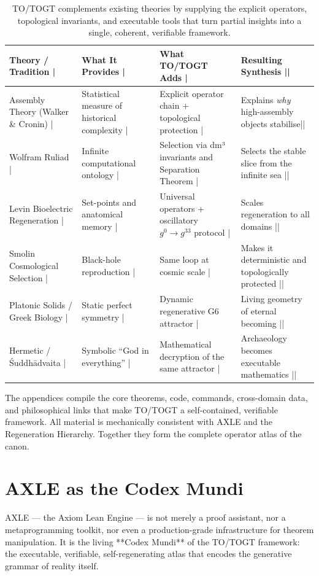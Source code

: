 \documentclass[19pt]{book}
\theoremstyle{plain}
\theoremstyle{definition}
\theoremstyle{remark}
\begin{document}
\begin{enumerate}
\begin{itemize}
\begin{table}[htbp]
\centering
\small
\begin{tabularx}{\textwidth}{}
\toprule
\textbf{Theory / Tradition |} & 
\textbf{What It Provides |} & 
\textbf{What TO/TOGT Adds |} & 
\textbf{Resulting Synthesis ||} \\
\midrule
Assembly Theory (Walker \& Cronin) | & 
Statistical measure of historical complexity | & 
Explicit operator chain + topological protection | & 
Explains \emph{why} high-assembly objects stabilise|| \\
Wolfram Ruliad | & 
Infinite computational ontology | & 
Selection via dm³ invariants and Separation Theorem | & 
Selects the stable slice from the infinite sea || \\
Levin Bioelectric Regeneration | & 
Set-points and anatomical memory | & 
Universal operators + oscillatory \(g^0 \to g^{33}\) protocol | & 
Scales regeneration to all domains || \\
Smolin Cosmological Selection | & 
Black-hole reproduction | & 
Same loop at cosmic scale | & 
Makes it deterministic and topologically protected || \\
Platonic Solids / Greek Biology | & 
Static perfect symmetry | & 
Dynamic regenerative G6 attractor | & 
Living geometry of eternal becoming || \\
Hermetic / Śuddhādvaita | & 
Symbolic “God in everything” | & 
Mathematical decryption of the same attractor | & 
Archaeology becomes executable mathematics || \\
\bottomrule
\end{tabularx}
\caption{TO/TOGT complements existing theories by supplying the explicit operators, topological invariants, and executable tools that turn partial insights into a single, coherent, verifiable framework.}
\label{tab:theory-comparison}
\end{table}

The appendices compile the core theorems, code, commands, cross-domain data, and philosophical links that make TO/TOGT a self-contained, verifiable framework. All material is mechanically consistent with AXLE and the Regeneration Hierarchy. Together they form the complete operator atlas of the canon.

\chapter{AXLE as the Codex Mundi}

AXLE — the Axiom Lean Engine — is not merely a proof assistant, nor a metaprogramming toolkit, nor even a production-grade infrastructure for theorem manipulation. It is the living **Codex Mundi** of the TO/TOGT framework: the executable, verifiable, self-regenerating atlas that encodes the generative grammar of reality itself.  


\end{itemize}
\end{enumerate}
\end{document}
